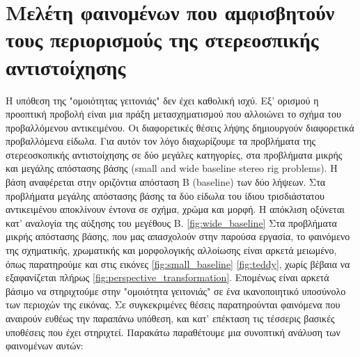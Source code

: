\section{Μελέτη φαινομένων που αμφισβητούν τους περιορισμούς της στερεοσπικής αντιστοίχησης} \label{sec:stereo_constraints_violation}

Η υπόθεση της "ομοιότητας γειτονιάς" δεν έχει καθολική ισχύ. Εξ' ορισμού η προοπτική προβολή είναι μια πράξη μετασχηματισμού που αλλοιώνει το σχήμα του προβαλλόμενου αντικειμένου. Οι διαφορετικές θέσεις λήψης δημιουργούν διαφορετικά προβαλλόμενα είδωλα. Για αυτόν τον λόγο διαχωρίζουμε τα προβλήματα της στερεοσκοπικής αντιστοίχησης σε δύο μεγάλες κατηγορίες, στα προβλήματα μικρής και μεγάλης απόστασης βάσης \e (small and wide baseline stereo rig problems). \g Η βάση αναφέρεται στην οριζόντια απόσταση \e B (baseline) \g των δύο λήψεων. Στα προβλήματα μεγάλης απόστασης βάσης τα δύο είδωλα του ίδιου τρισδιάστατου αντικειμένου αποκλίνουν έντονα σε σχήμα, χρώμα και μορφή. Η απόκλιση οξύνεται κατ' αναλογία της αύξησης του μεγέθους \e B. \g \ref{fig:wide_baseline}
Στα προβλήματα μικρής απόστασης βάσης, που μας απασχολούν στην παρούσα εργασία, το φαινόμενο της σχηματικής, χρωματικής και μορφολογικής αλλοίωσης είναι αρκετά μειωμένο, όπως παρατηρούμε και στις εικόνες \ref{fig:small_baseline} \ref{fig:teddy}, χωρίς βέβαια να εξαφανίζεται πλήρως \ref{fig:perspective_transformation}. Επομένως είναι αρκετά βάσιμο να στηριχτούμε στην "ομοιότητα γειτονιάς" σε ένα ικανοποιητικό υποσύνολο των περιοχών της εικόνας. Σε συγκεκριμένες θέσεις παρατηρούνται φαινόμενα που αναιρούν ευθέως την παραπάνω υπόθεση, και κατ' επέκταση τις τέσσερις βασικές υποθέσεις που έχει στηριχτεί. Παρακάτω παραθέτουμε μια συνοπτική ανάλυση των φαινομένων αυτών:

